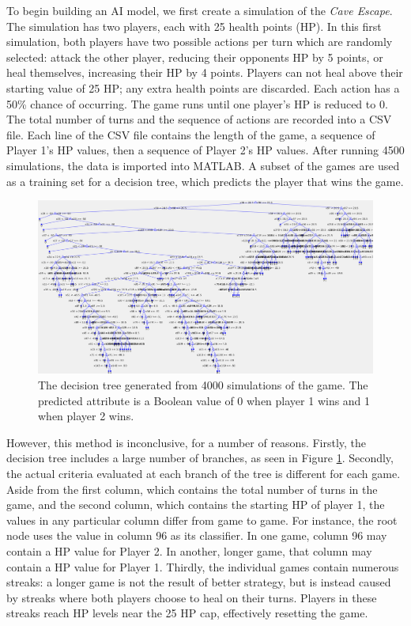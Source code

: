 To begin building an AI model, we first create a simulation of the \textit{Cave Escape}. The simulation has two players, each with 25 health points (HP). In this first simulation, both players have two possible actions per turn which are randomly selected: attack the other player, reducing their opponents HP by 5 points, or heal themselves, increasing their HP by 4 points. Players can not heal above their starting value of 25 HP; any extra health points are discarded. Each action has a 50\% chance of occurring. The game runs until one player's HP is reduced to 0. The total number of turns and the sequence of actions are recorded into a CSV file. Each line of the CSV file contains the length of the game, a sequence of Player 1's HP values, then a sequence of Player 2's HP values. After running 4500 simulations, the data is imported into MATLAB. A subset of the games are used as a training set for a decision tree, which predicts the player that wins the game.\\

\begin{figure}[H]
  \centering
  \includegraphics[width=13cm]{figures/firstDecisionTree.png}
  \caption{The decision tree generated from 4000 simulations of the game. The predicted attribute is a Boolean value of 0 when player 1 wins and 1 when player 2 wins.}
  \label{fig:decisionTree1}
\end{figure}

However, this method is inconclusive, for a number of reasons. Firstly, the decision tree includes a  large number of branches, as seen in Figure \ref{fig:decisionTree1}. Secondly, the actual criteria evaluated at each branch of the tree is different for each game. Aside from the first column, which contains the total number of turns in the game, and the second column, which contains the starting HP of player 1, the values in any particular column differ from game to game. For instance, the root node uses the value in column 96 as its classifier. In one game, column 96 may contain a HP value for Player 2. In another, longer game, that column may contain a HP value for Player 1. Thirdly, the individual games contain numerous streaks: a longer game is not the result of better strategy, but is instead caused by streaks where both players choose to heal on their turns. Players in these streaks reach HP levels near the 25 HP cap, effectively resetting the game.

